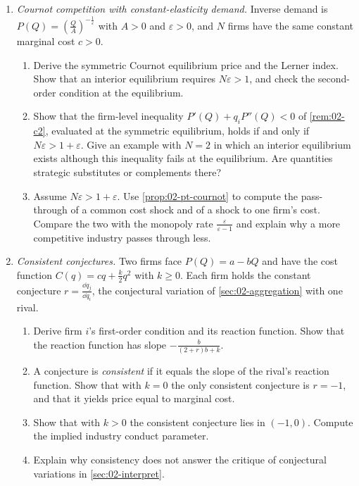 \begin{enumerate}[label=\arabic*., leftmargin=*, itemsep=6pt]

\item \textit{Cournot competition with constant-elasticity demand.} Inverse demand is
$P(Q) = \left(\frac{Q}{A}\right)^{-\frac{1}{\varepsilon}}$ with $A > 0$ and $\varepsilon > 0$, and $N$ firms have
the same constant marginal cost $c > 0$.
\begin{enumerate}[label=(\alph*)]
  \item Derive the symmetric Cournot equilibrium price and the Lerner index. Show that an interior equilibrium
  requires $N\varepsilon > 1$, and check the second-order condition at the equilibrium.
  \item Show that the firm-level inequality $P'(Q) + q_iP''(Q) < 0$ of \cref{rem:02-c2}, evaluated at the symmetric
  equilibrium, holds if and only if $N\varepsilon > 1 + \varepsilon$. Give an example with $N = 2$ in which an
  interior equilibrium exists although this inequality fails at the equilibrium. Are quantities strategic
  substitutes or complements there?
  \item Assume $N\varepsilon > 1 + \varepsilon$. Use \cref{prop:02-pt-cournot} to compute the pass-through of a
  common cost shock and of a shock to one firm's cost. Compare the two with the monopoly rate $\frac{\varepsilon}{\varepsilon - 1}$ and explain why a more
  competitive industry passes through less.
\end{enumerate}

\item \textit{Consistent conjectures.} Two firms face $P(Q) = a - bQ$ and have the cost function
$C(q) = cq + \frac{k}{2}q^2$ with $k \ge 0$. Each firm holds the constant conjecture
$r = \frac{\dd q_j}{\dd q_i}$, the conjectural variation of \cref{sec:02-aggregation} with one rival.
\begin{enumerate}[label=(\alph*)]
  \item Derive firm $i$'s first-order condition and its reaction function. Show that the reaction function has slope
  $-\frac{b}{(2 + r)b + k}$.
  \item A conjecture is \emph{consistent} if it equals the slope of the rival's reaction function. Show that with
  $k = 0$ the only consistent conjecture is $r = -1$, and that it yields price equal to marginal cost.
  \item Show that with $k > 0$ the consistent conjecture lies in $(-1, 0)$. Compute the implied industry conduct
  parameter.
  \item Explain why consistency does not answer the critique of conjectural variations in
  \cref{sec:02-interpret}.
\end{enumerate}


\end{enumerate}
